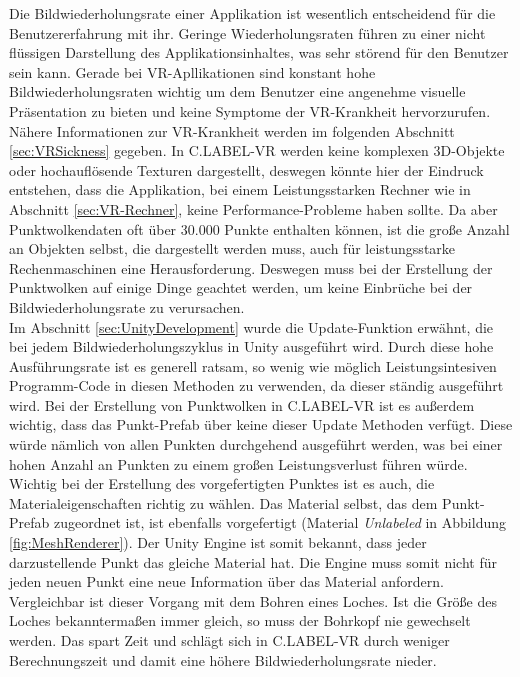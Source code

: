 Die Bildwiederholungsrate einer Applikation ist wesentlich entscheidend für die Benutzererfahrung mit ihr. Geringe Wiederholungsraten führen zu einer nicht flüssigen Darstellung des Applikationsinhaltes, was sehr störend für den Benutzer sein kann. Gerade bei VR-Apllikationen sind konstant hohe Bildwiederholungsraten wichtig um dem Benutzer eine angenehme visuelle Präsentation zu bieten und keine Symptome der VR-Krankheit hervorzurufen. Nähere Informationen zur VR-Krankheit werden im folgenden Abschnitt \ref{sec:VRSickness} gegeben. In C.LABEL-VR werden keine komplexen 3D-Objekte oder hochauflösende Texturen dargestellt, deswegen könnte hier der Eindruck entstehen, dass die Applikation, bei einem Leistungsstarken Rechner wie in Abschnitt \ref{sec:VR-Rechner}, keine Performance-Probleme haben sollte. Da aber Punktwolkendaten oft über 30.000 Punkte enthalten können, ist die große Anzahl an Objekten selbst, die dargestellt werden muss, auch für leistungsstarke Rechenmaschinen eine Herausforderung. Deswegen muss bei der Erstellung der Punktwolken auf einige Dinge geachtet werden, um keine Einbrüche bei der Bildwiederholungsrate zu verursachen.\\

Im Abschnitt \ref{sec:UnityDevelopment} wurde die Update-Funktion erwähnt, die bei jedem Bildwiederholungszyklus in Unity ausgeführt wird. Durch diese hohe Ausführungsrate ist es generell ratsam, so wenig wie möglich Leistungsintesiven Programm-Code in diesen Methoden zu verwenden, da dieser ständig ausgeführt wird. Bei der Erstellung von Punktwolken in C.LABEL-VR ist es außerdem wichtig, dass das Punkt-Prefab über keine dieser Update Methoden verfügt. Diese würde nämlich von allen Punkten durchgehend ausgeführt werden, was bei einer hohen Anzahl an Punkten zu einem großen Leistungsverlust führen würde.\\

Wichtig bei der Erstellung des vorgefertigten Punktes ist es auch, die Materialeigenschaften richtig zu wählen. Das Material selbst, das dem Punkt-Prefab zugeordnet ist, ist ebenfalls vorgefertigt (Material \textit{Unlabeled} in Abbildung \ref{fig:MeshRenderer}). Der Unity Engine ist somit bekannt, dass jeder darzustellende Punkt das gleiche Material hat. Die Engine muss somit nicht für jeden neuen Punkt eine neue Information über das Material anfordern. Vergleichbar ist dieser Vorgang mit dem Bohren eines Loches. Ist die Größe des Loches bekanntermaßen immer gleich, so muss der Bohrkopf nie gewechselt werden. Das spart Zeit und schlägt sich in C.LABEL-VR durch weniger Berechnungszeit und damit eine höhere Bildwiederholungsrate nieder.\\


